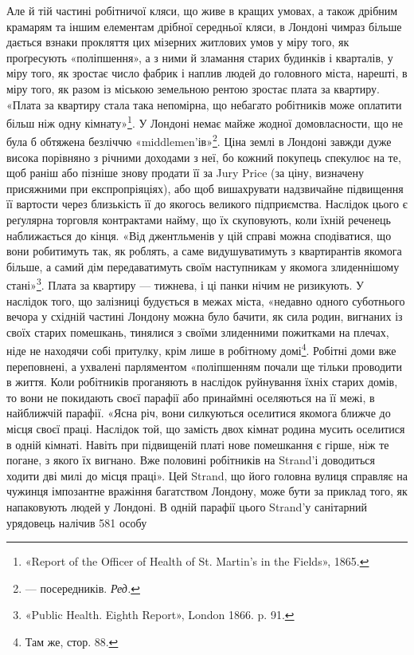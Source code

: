 Але й тій частині робітничої кляси, що живе в кращих умовах,
а також дрібним крамарям та іншим елементам дрібної
середньої кляси, в Лондоні чимраз більше дається взнаки прокляття
цих мізерних житлових умов у міру того, як проґресують
«поліпшення», а з ними й зламання старих будинків і кварталів,
у міру того, як зростає число фабрик і наплив людей до головного
міста, нарешті, в міру того, як разом із міською земельною
рентою зростає плата за квартиру. «Плата за квартиру стала
така непомірна, що небагато робітників може оплатити більш
ніж одну кімнату»\footnote{
«Report of the Officer of Health of St. Martin’s in the Fields», 1865.
}. У Лондоні немає майже жодної домовласности,
що не була б обтяжена безліччю «middlemen’ів»\footnote*{
— посередників. \emph{Ред.}
}. Ціна
землі в Лондоні завжди дуже висока порівняно з річними доходами
з неї, бо кожний покупець спекулює на те, щоб раніш або
пізніше знову продати її за Jury Price (за ціну, визначену присяжними
при експропріяціях), або щоб вишахрувати надзвичайне
підвищення її вартости через близькість її до якогось великого
підприємства. Наслідок цього є реґулярна торговля контрактами
найму, що їх скуповують, коли їхній реченець наближається
до кінця. «Від джентльменів у цій справі можна сподіватися, що
вони робитимуть так, як роблять, а саме видушуватимуть з
квартирантів якомога більше, а самий дім передаватимуть своїм
наступникам у якомога злиденнішому стані»\footnote{
«Public Health. Eighth Report», London 1866. p. 91.
}. Плата за квартиру
— тижнева, і ці панки нічим не ризикують. У наслідок
того, що залізниці будується в межах міста, «недавно одного
суботнього вечора у східній частині Лондону можна було бачити,
як сила родин, вигнаних із своїх старих помешкань, тинялися
з своїми злиденними пожитками на плечах, ніде не находячи
собі притулку, крім лише в робітному домі\footnote{
Там же, стор. 88.
}. Робітні
доми вже переповнені, а ухвалені парляментом «поліпшенням
почали ще тільки проводити в життя. Коли робітників проганяють
в наслідок руйнування їхніх старих домів, то вони не покидають
своєї парафії або принаймні оселяються на її межі, в найближчій
парафії. «Ясна річ, вони силкуються оселитися якомога
ближче до місця своєї праці. Наслідок той, що замість двох кімнат
родина мусить оселитися в одній кімнаті. Навіть при підвищеній
платі нове помешкання є гірше, ніж те погане, з якого їх вигнано.
Вже половині робітників на Strand’і доводиться ходити дві милі
до місця праці». Цей Strand, що його головна вулиця справляє
на чужинця імпозантне вражіння багатством Лондону, може
бути за приклад того, як напаковують людей у Лондоні. В одній
парафії цього Strand’у санітарний урядовець налічив 581 особу
\parbreak{}  %

